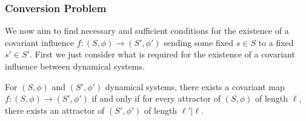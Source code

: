 \subsubsection{Conversion Problem}

We now aim to find necessary and sufficient conditions for the existence of a covariant influence $f:(S,\phi)\rightarrow (S',\phi')$ sending some fixed $s \in S$ to a fixed $s' \in S'$. First we just consider what is required for the existence of a covariant influence between dynamical systems.

\begin{nthm}[label=thm:existCov]{\cite[Prop 13]{ScandGourSanders}}
    For $(S,\phi)$ and $(S',\phi')$ dynamical systems, there exists a covariant map $f:(S,\phi)\rightarrow (S',\phi')$ if and only if for every attractor of $(S,\phi)$ of length $\ell$, there exists an attractor of $(S',\phi')$ of length $\ell'\vert \ell$.
\end{nthm}
